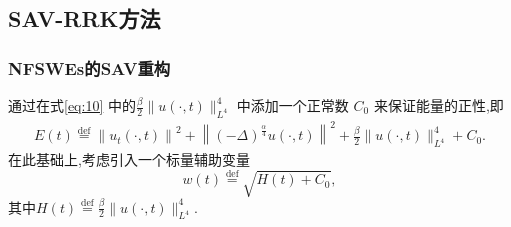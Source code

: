 \documentclass[aspectratio=169]{beamer}
\numberwithin{theorem}{section} %
\numberwithin{equation}{section}%
\numberwithin{figure}{section}%
\numberwithin{table}{section}%
\begin{document}
\subsection{SAV-RRK方法}
		
		
	
\begin{frame}\frametitle{NFSWEs的SAV重构}
	通过在式\eqref{eq:10} 中的$\frac{\beta}{2}\|u(\cdot, t)\|_{L^{4}}^{4}$ 中添加一个正常数 $C_0$ 来保证能量的正性,即
	\begin{align}\label{eq_SAVRRK:9_1}
		E(t)\overset{\text{def}}{=}\left\|u_{t}(\cdot, t)\right\|^{2}+\left\|(-\Delta)^{\frac{\alpha}{4}} u(\cdot, t)\right\|^{2}+\frac{\beta}{2}\|u(\cdot, t)\|_{L^{4}}^{4} + C_0.
	\end{align}
	在此基础上,考虑{\color{purple}引入一个标量辅助变量}
	\begin{equation}
		w(t)\overset{\text{def}}{=}\sqrt{H(t)+C_0},
	\end{equation}
	其中$H(t)\overset{\text{def}}{=}\frac{\beta}{2}\|u(\cdot, t)\|_{L^{4}}^{4} .$
\end{frame}
\end{document}
